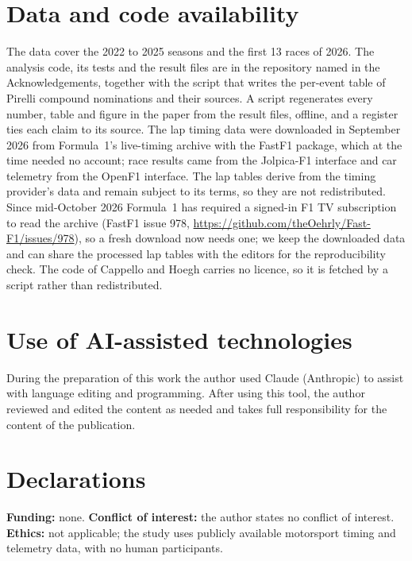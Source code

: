 \documentclass[11pt]{article}
\begin{document}
\section*{Data and code availability}
The data cover the 2022 to 2025 seasons and the first 13 races of 2026.
The analysis code, its tests and the result files are in the repository named in the Acknowledgements, together with the script that writes the per-event table of Pirelli compound nominations and their sources.
A script regenerates every number, table and figure in the paper from the result files, offline, and a register ties each claim to its source.
The lap timing data were downloaded in September 2026 from Formula~1's live-timing archive with the FastF1 package, which at the time needed no account; race results came from the Jolpica-F1 interface and car telemetry from the OpenF1 interface.
The lap tables derive from the timing provider's data and remain subject to its terms, so they are not redistributed.
Since mid-October 2026 Formula~1 has required a signed-in F1 TV subscription to read the archive (FastF1 issue 978, \url{https://github.com/theOehrly/Fast-F1/issues/978}), so a fresh download now needs one; we keep the downloaded data and can share the processed lap tables with the editors for the reproducibility check.
The code of Cappello and Hoegh carries no licence, so it is fetched by a script rather than redistributed.

\section*{Use of AI-assisted technologies}
During the preparation of this work the author used Claude (Anthropic) to assist with language editing and programming.
After using this tool, the author reviewed and edited the content as needed and takes full responsibility for the content of the publication.

\section*{Declarations}
\textbf{Funding:} none. \textbf{Conflict of interest:} the author states no conflict of interest. \textbf{Ethics:} not applicable; the study uses publicly available motorsport timing and telemetry data, with no human participants.





\end{document}
